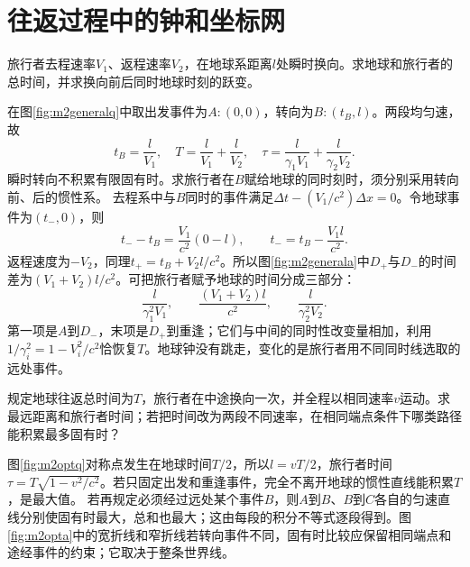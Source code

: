 \section{往返过程中的钟和坐标网}
\begin{example}\label{ex:m2generalturn}
旅行者去程速率$V_1$、返程速率$V_2$，在地球系距离$l$处瞬时换向。求地球和旅行者的总时间，并求换向前后同时地球时刻的跃变。
\end{example}
\begin{solution}
在图\ref{fig:m2generalq}中取出发事件为$A:(0,0)$，转向为$B:(t_B,l)$。两段均匀速，故
\[
 t_B=\frac l{V_1},\quad T=\frac l{V_1}+\frac l{V_2},\quad
 \tau=\frac l{\gamma_1V_1}+\frac l{\gamma_2V_2}.
\]
瞬时转向不积累有限固有时。求旅行者在$B$赋给地球的同时刻时，须分别采用转向前、后的惯性系。
去程系中与$B$同时的事件满足$\Delta t-(V_1/c^2)\Delta x=0$。令地球事件为$(t_-,0)$，则
\[
 t_--t_B=\frac{V_1}{c^2}(0-l),\qquad
 t_-=t_B-\frac{V_1l}{c^2}.
\]
返程速度为$-V_2$，同理$t_+=t_B+V_2l/c^2$。所以图\ref{fig:m2generala}中$D_+$与$D_-$的时间差为$(V_1+V_2)l/c^2$。可把旅行者赋予地球的时间分成三部分：
\[
 \frac{l}{\gamma_1^2V_1},\qquad
 \frac{(V_1+V_2)l}{c^2},\qquad
 \frac{l}{\gamma_2^2V_2}.
\]
第一项是$A$到$D_-$，末项是$D_+$到重逢；它们与中间的同时性改变量相加，利用$1/\gamma_i^2=1-V_i^2/c^2$恰恢复$T$。地球钟没有跳走，变化的是旅行者用不同同时线选取的远处事件。
\end{solution}

\begin{example}\label{ex:m2outbackopt}
规定地球往返总时间为$T$，旅行者在中途换向一次，并全程以相同速率$v$运动。求最远距离和旅行者时间；若把时间改为两段不同速率，在相同端点条件下哪类路径能积累最多固有时？
\end{example}
\begin{solution}
图\ref{fig:m2optq}对称点发生在地球时间$T/2$，所以$l=vT/2$，旅行者时间$\tau=T\sqrt{1-v^2/c^2}$。若只固定出发和重逢事件，完全不离开地球的惯性直线能积累$T$，是最大值。
若再规定必须经过远处某个事件$B$，则$A$到$B$、$B$到$C$各自的匀速直线分别使固有时最大，总和也最大；这由每段的积分不等式逐段得到。图\ref{fig:m2opta}中的宽折线和窄折线若转向事件不同，固有时比较应保留相同端点和途经事件的约束；它取决于整条世界线。
\end{solution}

